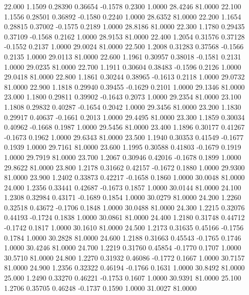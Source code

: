   22.000   1.1509   0.28390   0.36654  -0.1578   0.2300   1.0000  28.4246  81.0000
  22.100   1.1556   0.28501   0.36892  -0.1580   0.2240   1.0000  28.6352  81.0000
  22.200   1.1654   0.28815   0.37002  -0.1575   0.2189   1.0000  28.8186  81.0000
  22.300   1.1780   0.29435   0.37109  -0.1568   0.2162   1.0000  28.9153  81.0000
  22.400   1.2054   0.31576   0.37128  -0.1552   0.2137   1.0000  29.0024  81.0000
  22.500   1.2008   0.31283   0.37568  -0.1566   0.2135   1.0000  29.0113  81.0000
  22.600   1.1961   0.30957   0.38018  -0.1581   0.2131   1.0000  29.0235  81.0000
  22.700   1.1911   0.30604   0.38483  -0.1596   0.2126   1.0000  29.0418  81.0000
  22.800   1.1861   0.30244   0.38965  -0.1613   0.2118   1.0000  29.0732  81.0000
  22.900   1.1818   0.29940   0.39455  -0.1629   0.2101   1.0000  29.1346  81.0000
  23.000   1.1800   0.29811   0.39902  -0.1643   0.2073   1.0000  29.2354  81.0000
  23.100   1.1808   0.29832   0.40287  -0.1654   0.2042   1.0000  29.3456  81.0000
  23.200   1.1830   0.29917   0.40637  -0.1661   0.2013   1.0000  29.4495  81.0000
  23.300   1.1859   0.30034   0.40962  -0.1668   0.1987   1.0000  29.5456  81.0000
  23.400   1.1896   0.30177   0.41267  -0.1673   0.1962   1.0000  29.6343  81.0000
  23.500   1.1940   0.30353   0.41549  -0.1677   0.1939   1.0000  29.7161  81.0000
  23.600   1.1995   0.30588   0.41803  -0.1679   0.1919   1.0000  29.7919  81.0000
  23.700   1.2067   0.30946   0.42016  -0.1678   0.1899   1.0000  29.8622  81.0000
  23.800   1.2178   0.31662   0.42157  -0.1672   0.1880   1.0000  29.9300  81.0000
  23.900   1.2402   0.33873   0.42217  -0.1658   0.1860   1.0000  30.0048  81.0000
  24.000   1.2356   0.33441   0.42687  -0.1673   0.1857   1.0000  30.0144  81.0000
  24.100   1.2308   0.32984   0.43171  -0.1689   0.1854   1.0000  30.0279  81.0000
  24.200   1.2260   0.32518   0.43672  -0.1706   0.1848   1.0000  30.0488  81.0000
  24.300   1.2215   0.32076   0.44193  -0.1724   0.1838   1.0000  30.0861  81.0000
  24.400   1.2180   0.31748   0.44712  -0.1742   0.1817   1.0000  30.1610  81.0000
  24.500   1.2173   0.31635   0.45166  -0.1756   0.1784   1.0000  30.2828  81.0000
  24.600   1.2188   0.31663   0.45543  -0.1765   0.1746   1.0000  30.4246  81.0000
  24.700   1.2219   0.31760   0.45854  -0.1770   0.1707   1.0000  30.5710  81.0000
  24.800   1.2270   0.31932   0.46086  -0.1772   0.1667   1.0000  30.7157  81.0000
  24.900   1.2356   0.32322   0.46194  -0.1766   0.1631   1.0000  30.8492  81.0000
  25.000   1.2490   0.33270   0.46221  -0.1753   0.1607   1.0000  30.9391  81.0000
  25.100   1.2706   0.35705   0.46248  -0.1737   0.1590   1.0000  31.0027  81.0000
